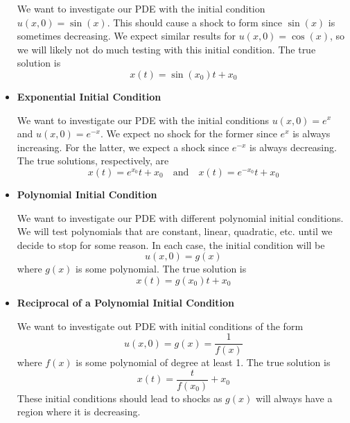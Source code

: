 \documentclass{myproject}
\begin{document}
\begin{itemize}
	We want to investigate our PDE with the initial condition $u(x, 0) = \sin(x)$. This should cause a shock to form since $\sin(x)$ is sometimes decreasing. We expect similar results for $u(x, 0) = \cos(x)$, so we will likely not do much testing with this initial condition. The true solution is
	\begin{equation}
		x(t) = \sin(x_0){t} + x_0
	\end{equation}

	\item \textbf{Exponential Initial Condition}

	We want to investigate our PDE with the initial conditions $u(x, 0) = e^x$ and $u(x, 0) = e^{-x}$. We expect no shock for the former since $e^x$ is always increasing. For the latter, we expect a shock since $e^{-x}$ is always decreasing. The true solutions, respectively, are 
	\begin{equation}
		x(t) = e^{x_0}{t} + x_0 \quad \text{and} \quad x(t) = e^{-x_0}{t} + x_0
	\end{equation}

	\item \textbf{Polynomial Initial Condition}

	We want to investigate our PDE with different polynomial initial conditions. We will test polynomials that are constant, linear, quadratic, etc. until we decide to stop for some reason. In each case, the initial condition will be
	\begin{equation}
		u(x, 0) = g(x)
	\end{equation}
	where $g(x)$ is some polynomial. The true solution is
	\begin{equation}
		x(t) = g(x_0){t} + x_0
	\end{equation}

	\item \textbf{Reciprocal of a Polynomial Initial Condition}

	We want to investigate out PDE with initial conditions of the form
	\begin{equation}
		u(x, 0) = g(x) = \frac{1}{f(x)}
	\end{equation}
	where $f(x)$ is some polynomial of degree at least 1. The true solution is
	\begin{equation}
		x(t) = \frac{t}{f(x_0)} + x_0
	\end{equation}
	These initial conditions should lead to shocks as $g(x)$ will always have a region where it is decreasing.

\end{itemize}
\end{document}

